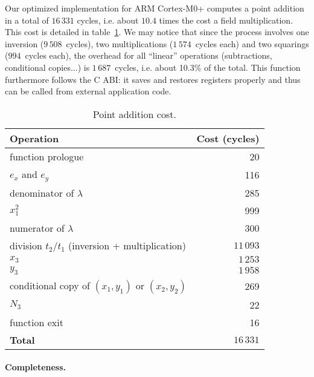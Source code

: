 \documentclass{llncs}
\begin{document}
Our optimized implementation for ARM Cortex-M0+ computes a point
addition in a total of $16\,331$ cycles, i.e. about $10.4$ times the
cost a field multiplication. This cost is detailed in
table~\ref{tab:pointadd}. We may notice that since the process involves
one inversion ($9\,508$~cycles), two multiplications ($1\,574$~cycles
each) and two squarings ($994$~cycles each), the overhead for all
``linear'' operations (subtractions, conditional copies...) is
$1\,687$~cycles, i.e. about 10.3\% of the total. This function
furthermore follows the C ABI: it saves and restores registers properly
and thus can be called from external application code.

\begin{table}[H]
\begin{center}
    \begin{tabular}{|l|r|}
    \hline
    \textsf{\textbf{Operation}} & \textsf{\textbf{Cost (cycles)}} \\
    \hline
    function prologue                                  &        20 \\
    $e_x$ and $e_y$                                    &       116 \\
    denominator of $\lambda$                           &       285 \\
    $x_1^2$                                            &       999 \\
    numerator of $\lambda$                             &       300 \\
    division $t_2 / t_1$ (inversion + multiplication)  & $11\,093$ \\
    $x_3$                                              &  $1\,253$ \\
    $y_3$                                              &  $1\,958$ \\
    conditional copy of $(x_1,y_1)$ or $(x_2,y_2)$     &       269 \\
    $N_3$                                              &        22 \\
    function exit                                      &        16 \\
    \hline
    \textsf{\textbf{Total}}                            & $16\,331$ \\
    \hline
    \end{tabular}
\end{center}
\caption{\label{tab:pointadd}Point addition cost.}
\end{table}

\paragraph{Completeness.}
\end{document}
